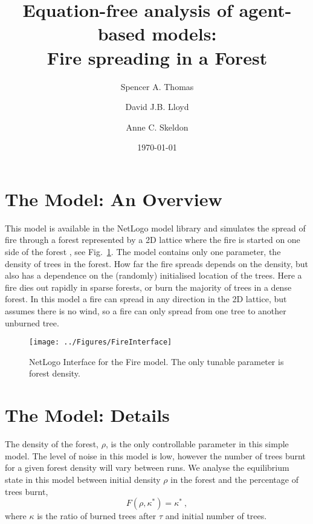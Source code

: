 \documentclass[11pt]{article}
\begin{document}
\title{Equation-free analysis of agent-based models:\\Fire spreading in a Forest}

\author{Spencer A. Thomas}
\author{David J.B. Lloyd}
\author{Anne C. Skeldon}
\date{\today}
\maketitle



\section{The Model: An Overview}

This model is available in the NetLogo \cite{Netlogo} model library and simulates the spread of fire through a forest represented by a 2D lattice where the fire is started on one side of the forest \cite{Fire}, see Fig.~\ref{fig:fire}. The model contains only one parameter, the density of trees in the forest. How far the fire spreads depends on the density, but also has a dependence on the (randomly) initialised location of the trees. Here a fire dies out rapidly in sparse forests, or burn the majority of trees in a dense forest. In this model a fire can spread in any direction in the 2D lattice, but assumes there is no wind, so a fire can only spread from one tree to another unburned tree.

\begin{figure}[h!]
        \centering
        		\texttt{[image: ../Figures/FireInterface]}
            \caption{NetLogo Interface for the Fire model. The only tunable parameter is forest density. \label{fig:fire}}
\end{figure}

\section{The Model: Details} 
\label{sec:details}

The density of the forest, $\rho$, is the only controllable parameter in this simple model. The level of noise in this model is low, however the number of trees burnt for a given forest density will vary between runs. We analyse the equilibrium state in this model between initial density $\rho$ in the forest and the percentage of trees burnt,
	\begin{equation}
		F(\rho, \kappa^\ast) = \kappa^\ast~,
	\end{equation}
	where $\kappa$ is the ratio of burned trees after $\tau$ and initial number of trees.
\end{document}

